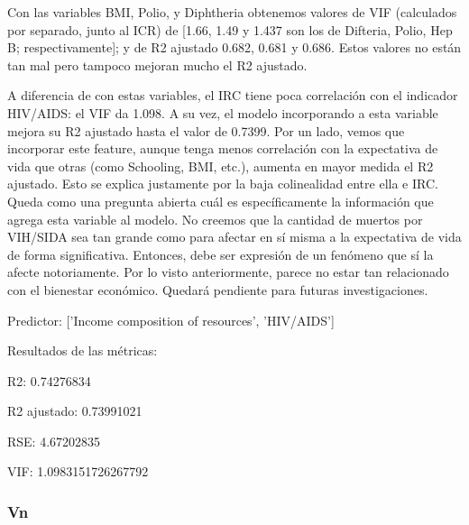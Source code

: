 Con las variables BMI, Polio, y Diphtheria obtenemos valores de VIF (calculados por separado, junto al ICR) de [1.66, 1.49 y 1.437 son los de Difteria, Polio, Hep B; respectivamente]; y de R2 ajustado 0.682, 0.681 y 0.686. Estos valores no están tan mal pero tampoco mejoran mucho el R2 ajustado.

A diferencia de con estas variables, el IRC tiene poca correlación con el indicador HIV/AIDS: el VIF da 1.098. A su vez, el modelo incorporando a esta variable mejora su R2 ajustado hasta el valor de 0.7399. Por un lado, vemos que incorporar este feature, aunque tenga menos correlación con la expectativa de vida que otras (como Schooling, BMI, etc.), aumenta en mayor medida el R2 ajustado. Esto se explica justamente por la baja colinealidad entre ella e IRC. Queda como una pregunta abierta cuál es específicamente la información que agrega esta variable al modelo. No creemos que la cantidad de muertos por VIH/SIDA sea tan grande como para afectar en sí misma a la expectativa de vida de forma significativa. Entonces, debe ser expresión de un fenómeno que sí la afecte notoriamente. Por lo visto anteriormente, parece no estar tan relacionado con el bienestar económico. Quedará pendiente para futuras investigaciones.   


Predictor: ['Income composition of resources', 'HIV/AIDS']

Resultados de las métricas:

R2: 0.74276834

R2 ajustado: 0.73991021

RSE: 4.67202835

VIF: 1.0983151726267792

\subsubsection{Vn}

